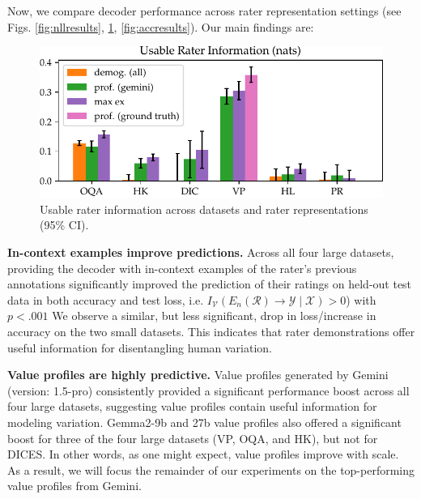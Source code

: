 \documentclass[11pt]{article}
\begin{document}
Now, we compare decoder performance across rater representation settings (see Figs. \ref{fig:nllresults}, \ref{fig:rater_info},  \ref{fig:accresults}).
Our main findings are:

\begin{figure}
\centering
\vspace{-5pt}  %
\includegraphics[width=0.75\columnwidth]{files/rater_info.pdf}

\caption{
Usable rater information across datasets and rater representations (95\% CI).
}
\label{fig:rater_info}
\vspace{-10pt}
\end{figure}

\textbf{In-context examples improve predictions.} 
Across all four large datasets, providing the decoder with in-context examples of the rater's previous annotations significantly improved the prediction of their ratings on held-out test data in both accuracy and test loss, i.e.  $I_\mathcal{V}(E_n(\mathcal{R}) \to \mathcal{Y} \mid \mathcal{X}) > 0$) with $p < .001$ We observe a similar, but less significant, drop in loss/increase in accuracy on the two small datasets. This indicates that rater demonstrations offer useful information for disentangling human variation.

\textbf{Value profiles are highly predictive.} 
Value profiles generated by Gemini (version: 1.5-pro) consistently provided a significant performance boost across all four large datasets, suggesting value profiles contain useful information for modeling variation. Gemma2-9b and 27b value profiles also offered a significant boost for three of the four large datasets (VP, OQA, and HK), but not for DICES. In other words, as one might expect, value profiles improve with scale. As a result, we will focus the remainder of our experiments on the top-performing value profiles from Gemini.
\end{document}
